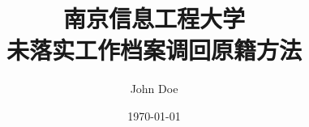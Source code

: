 \documentclass[UTF8]{ctexbeamer}
\title{南京信息工程大学\\未落实工作档案调回原籍方法}
\author{John Doe}
\begin{document}
\date{\today}
    \begin{frame}
        \titlepage
    \end{frame}
\end{document}
